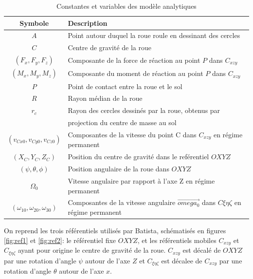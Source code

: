 \begin{table}[htbp]
  \centering
  \caption{Constantes et variables des modèle analytiques}
  \begin{tabular}{|c|l|}
    \hline\rowcolor[gray]{0.8}\color{black}
    Symbole         & Description\\\hline
    
    $A$             & Point autour duquel la roue roule en dessinant des cercles\\
    $C$             & Centre de gravité de la roue\\
    $(F_x,F_y,F_z)$          & Composante de la force de réaction au point $P$ dans $C_{xzy}$ \\
    $(M_x,M_y,M_z)$          & Composante du moment de réaction au point $P$ dans $C_{xzy}$ \\
    $P$             & Point de contact entre la roue et le sol\\
    $R$             & Rayon médian de la roue\\
    $r_c$             & Rayon des cercles dessinés par la roue, obtenus par\\
    & projection du centre de masse au sol\\
    $(v_{Cx0},v_{Cy0},v_{Cz0})$           & Composantes de la vitesse du point C dans $C_{xzy}$ en régime permanent \\
    $(X_C,Y_C,Z_C)$           & Position du centre de gravité dans le reférentiel $OXYZ$\\
    $(\psi,\theta,\phi)$       & Position angulaire de la roue dans $OXYZ$\\
    
    $\Omega_0$          & Vitesse angulaire par rapport à l'axe Z en régime permanent\\
    $(\omega_{10},\omega_{20},\omega_{30})$          & Composantes de la vitesse angulaire $\vec{omega_0}$ dans $C{\xi \eta \zeta}$ en régime permanent\\\hline
    
    
  \end{tabular}
  \label{tab:batista}
\end{table}

On reprend les trois référentiels utilisés par Batista, schématisés en figures \ref{fig:ref1} et \ref{fig:ref2}: le référentiel fixe  $OXYZ$, et les référentiels mobiles $C_{xzy}$ et $C_{\xi\eta\zeta}$ ayant pour origine le centre de gravité de la roue. $C_{xzy}$ est décalé de $OXYZ$ par une rotation d'angle $\psi$ autour de l'axe $Z$ et $C_{\xi\eta\zeta}$ est décalee de $C_{xzy}$ par une rotation d'angle $\theta$ autour de l'axe $x$.

